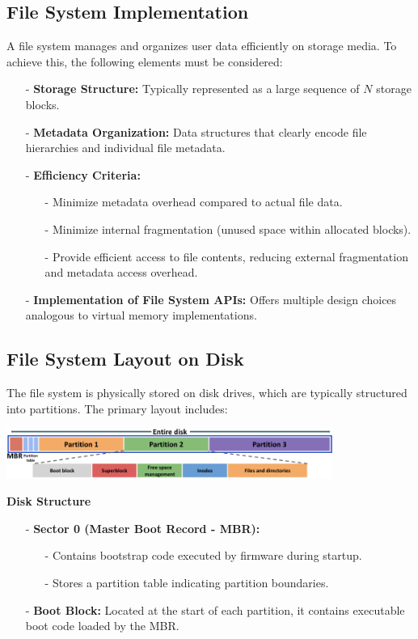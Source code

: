 \documentclass[../../compsys.tex]{subfiles}
\begin{document}
\subsection{File System Implementation}
A file system manages and organizes user data efficiently on storage media. To achieve this, the following elements must be considered:

\begin{itemize}[itemsep=2pt, topsep=1pt]
    \item[-] \textbf{Storage Structure:} Typically represented as a large sequence of $N$ storage blocks.
    \item[-] \textbf{Metadata Organization:} Data structures that clearly encode file hierarchies and individual file metadata.
    \item[-] \textbf{Efficiency Criteria:}
    \begin{itemize}
        \item[-] Minimize metadata overhead compared to actual file data.
        \item[-] Minimize internal fragmentation (unused space within allocated blocks).
        \item[-] Provide efficient access to file contents, reducing external fragmentation and metadata access overhead.
    \end{itemize}
    \item[-] \textbf{Implementation of File System APIs:} Offers multiple design choices analogous to virtual memory implementations.
\end{itemize}

\subsection{File System Layout on Disk}

The file system is physically stored on disk drives, which are typically structured into partitions. The primary layout includes:
\begin{center}
  \includegraphics[width=0.8\textwidth]{chapters/L6/images/fs-layout-ondisk.png}
\end{center}


\textbf{Disk Structure}\\
\begin{itemize}[itemsep=2pt, topsep=1pt]
    \item[-] \textbf{Sector 0 (Master Boot Record - MBR):}
\begin{itemize}[itemsep=2pt, topsep=1pt]
        \item[-] Contains bootstrap code executed by firmware during startup.
        \item[-] Stores a partition table indicating partition boundaries.
    \end{itemize}
    \item[-] \textbf{Boot Block:} Located at the start of each partition, it contains executable boot code loaded by the MBR.
\end{itemize}
\end{document}
